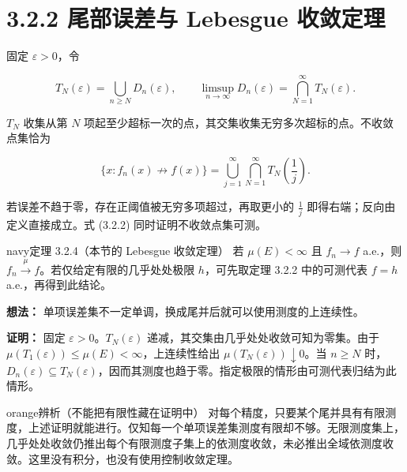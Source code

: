 \documentclass[11pt,a4paper]{article}
\begin{document}
\section[\S{}3.2.2 尾部误差与 Lebesgue
收敛定理]{3.2.2 尾部误差与 Lebesgue
收敛定理}\label{ux5c3eux90e8ux8befux5deeux4e0e-lebesgue-ux6536ux655bux5b9aux7406}

固定 \(\varepsilon>0\)，令

\begin{equation*}
T_N(\varepsilon)=\bigcup_{n\ge N}D_n(\varepsilon),\qquad
\limsup_{n\to\infty}D_n(\varepsilon)=\bigcap_{N=1}^{\infty}T_N(\varepsilon).
\tag{3.2.1}
\end{equation*}

\(T_N\) 收集从第 \(N\)
项起至少超标一次的点，其交集收集无穷多次超标的点。不收敛点集恰为

\begin{equation*}
\{x:f_n(x)\not\to f(x)\}
=\bigcup_{j=1}^{\infty}\bigcap_{N=1}^{\infty}T_N\!\left(\frac1j\right).
\tag{3.2.2}
\end{equation*}

若误差不趋于零，存在正阈值被无穷多项超过，再取更小的 \(\frac1j\)
即得右端；反向由定义直接成立。式 (3.2.2) 同时证明不收敛点集可测。

\begin{sboxenv}{navy}{定理 3.2.4（本节的 Lebesgue 收敛定理）}
若 \(\mu(E)<\infty\) 且 \(f_n\to f\) a.e.，则
\(f_n\xrightarrow{\mu}f\)。若仅给定有限的几乎处处极限 \(h\)，可先取定理
3.2.2 中的可测代表 \(f=h\) a.e.，再得到此结论。

\end{sboxenv}

\textbf{想法：}
单项误差集不一定单调，换成尾并后就可以使用测度的上连续性。

\textbf{证明：} 固定 \(\varepsilon>0\)。\(T_N(\varepsilon)\)
递减，其交集由几乎处处收敛可知为零集。由于
\(\mu(T_1(\varepsilon))\le\mu(E)<\infty\)，上连续性给出
\(\mu(T_N(\varepsilon))\downarrow0\)。当 \(n\ge N\)
时，\(D_n(\varepsilon)\subseteq T_N(\varepsilon)\)，因而其测度也趋于零。指定极限的情形由可测代表归结为此情形。

\begin{sboxenv}{orange}{辨析（不能把有限性藏在证明中）}
对每个精度，只要某个尾并具有有限测度，上述证明就能进行。仅知每一个单项误差集测度有限却不够。无限测度集上，几乎处处收敛仍推出每个有限测度子集上的依测度收敛，未必推出全域依测度收敛。这里没有积分，也没有使用控制收敛定理。

\end{sboxenv}
\end{document}
